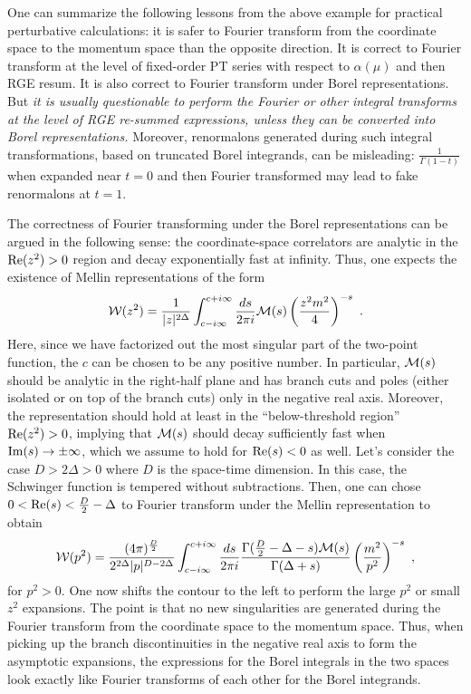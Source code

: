 \documentclass[a4paper,11pt]{article}
\begin{document}
One can summarize the following lessons from the above example for practical perturbative calculations: it is safer to Fourier transform from the coordinate space to the momentum space than the opposite direction. It is correct to Fourier transform at the level of fixed-order PT series with respect to $\alpha(\mu)$ and then RGE resum. It is also correct to Fourier transform under Borel representations. But {\it it is usually questionable to perform the Fourier or other integral transforms at the level of RGE re-summed expressions, unless they can be converted into Borel representations.} Moreover, renormalons generated during such integral transformations, based on truncated Borel integrands, can be misleading: $\frac{1}{\Gamma(1-t)}$ when expanded near $t=0$ and then Fourier transformed may lead to fake renormalons at $t=1$. 

The correctness of Fourier transforming under the Borel representations can be argued in the following sense: the coordinate-space correlators are analytic in the ${\rm Re}(z^2)>0$ region and decay exponentially fast at infinity. Thus, one expects the existence of Mellin representations of the form
\begin{align}
{\cal W}(z^2)=\frac{1}{|z|^{2\Delta}}\int_{c-i\infty}^{c+i\infty} \frac{ds}{2\pi i}{\cal M}(s)\left(\frac{z^2m^2}{4}\right)^{-s} \ .
\end{align}
Here, since we have factorized out the most singular part of the two-point function, the $c$ can be chosen to be any positive number. In particular, ${\cal M}(s)$ should be analytic in the right-half plane and has branch cuts and poles (either isolated or on top of the branch cuts) only in the negative real axis. Moreover, the representation should hold at least in the ``below-threshold region'' ${\rm Re}(z^2)>0$, 
implying that ${\cal M}(s)$ should decay sufficiently fast when ${\rm Im}(s) \rightarrow \pm \infty$, which we assume to hold for ${\rm Re}(s)<0$ as well. Let's consider the case $D>2\Delta>0$ where $D$ is the space-time dimension. In this case, the Schwinger function is tempered without subtractions. Then, one can  chose $0<{\rm Re }(s)<\frac{D}{2}-\Delta$ to Fourier transform under the Mellin representation to obtain
\begin{align}
{\cal W}(p^2)=\frac{(4\pi)^{\frac{D}{2}}}{2^{2\Delta}|p|^{D-2\Delta}}\int_{c-i\infty}^{c+i\infty} \frac{ds}{2\pi i}\frac{\Gamma(\frac{D}{2}-\Delta-s){\cal M}(s)}{\Gamma(\Delta+s)}\left(\frac{m^2}{p^2}\right)^{-s} \ ,
\end{align}
for $p^2>0$. One now shifts the contour to the left to perform the large $p^2$ or small $z^2$ expansions. The point is that no new singularities are generated during the Fourier transform from the coordinate space to the momentum space. Thus, when picking up the branch discontinuities in the negative real axis to form the asymptotic expansions, the expressions for the Borel integrals in the two spaces look exactly like Fourier transforms of each other for the Borel integrands.
\end{document}
